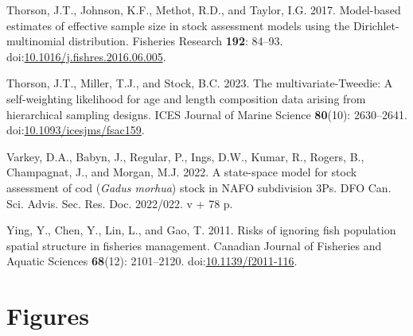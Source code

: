 \documentclass[
]{article}
\newlength{\cslhangindent}
\newlength{\cslentryspacingunit} %
\newenvironment{CSLReferences}[2] %
 {%
  \setlength{\parindent}{0pt}
  \ifodd #1
  \let\oldpar\par
  \def\par{\hangindent=\cslhangindent\oldpar}
  \fi
  \setlength{\parskip}{#2\cslentryspacingunit}
 }%
 {}
\begin{document}
\begin{CSLReferences}{1}{0}
\leavevmode{}%
Thorson, J.T., Johnson, K.F., Methot, R.D., and Taylor, I.G. 2017. Model-based estimates of effective sample size in stock assessment models using the {D}irichlet-multinomial distribution. Fisheries Research \textbf{192}: 84--93. doi:\href{https://doi.org/10.1016/j.fishres.2016.06.005}{10.1016/j.fishres.2016.06.005}.

\leavevmode{}%
Thorson, J.T., Miller, T.J., and Stock, B.C. 2023. The multivariate-{T}weedie: A self-weighting likelihood for age and length composition data arising from hierarchical sampling designs. ICES Journal of Marine Science \textbf{80}(10): 2630--2641. doi:\href{https://doi.org/10.1093/icesjms/fsac159}{10.1093/icesjms/fsac159}.

\leavevmode{}%
Varkey, D.A., Babyn, J., Regular, P., Ings, D.W., Kumar, R., Rogers, B., Champagnat, J., and Morgan, M.J. 2022. A state-space model for stock assessment of cod (\emph{{G}adus morhua}) stock in NAFO subdivision 3Ps. {DFO} {Can.} {Sci.} {Advis.} {Sec.} {Res.} {Doc.} 2022/022. v + 78 p.

\leavevmode{}%
Ying, Y., Chen, Y., Lin, L., and Gao, T. 2011. Risks of ignoring fish population spatial structure in fisheries management. Canadian Journal of Fisheries and Aquatic Sciences \textbf{68}(12): 2101--2120. doi:\href{https://doi.org/10.1139/f2011-116}{10.1139/f2011-116}.

\end{CSLReferences}

\pagebreak

\pagebreak

\hypertarget{figures}{%
\section*{Figures}\label{figures}}
\end{document}

